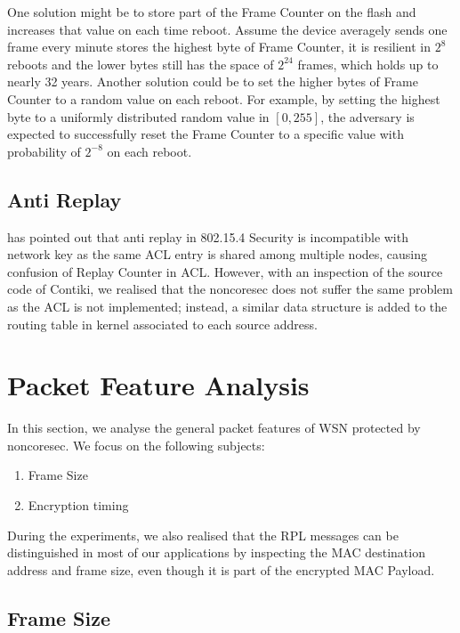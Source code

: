 One solution might be to store part of the Frame Counter on the flash and increases that value on each time reboot. Assume the device averagely sends one frame every minute stores the highest byte of Frame Counter, it is resilient in $2^8$ reboots and the lower bytes still has the space of $2^{24}$ frames, which holds up to nearly 32 years. Another solution could be to set the higher bytes of Frame Counter to a random value on each reboot. For example, by setting the highest byte to a uniformly distributed random value in $[0,255]$, the adversary is expected to successfully reset the Frame Counter to a specific value with probability of $2^{-8}$ on each reboot.

\subsection{Anti Replay}

\cite{802154sec} has pointed out that anti replay in 802.15.4 Security is incompatible with network key as the same ACL entry is shared among multiple nodes, causing confusion of Replay Counter in ACL. However, with an inspection of the source code of Contiki, we realised that the noncoresec does not suffer the same problem as the ACL is not implemented; instead, a similar data structure is added to the routing table in kernel  associated to each source address.

\section{Packet Feature Analysis}

In this section, we analyse the general packet features of WSN protected by noncoresec. We focus on the following subjects:

\begin{enumerate}
	\item Frame Size
	\item Encryption timing
\end{enumerate}

During the experiments, we also realised that the RPL messages can be distinguished in most of our applications by inspecting the MAC destination address and frame size, even though it is part of the encrypted MAC Payload.

\subsection{Frame Size} \label{noncoresec frame size}

